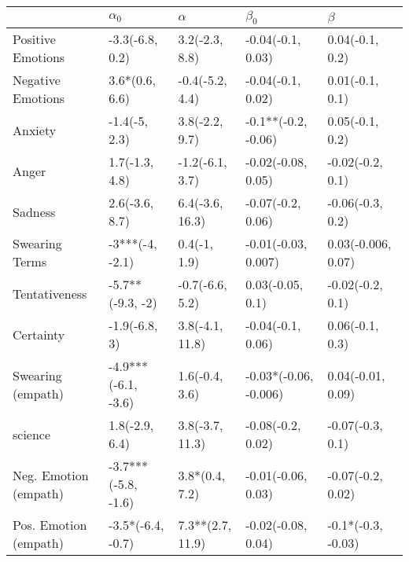 \begin{tabular}{lllll}
\toprule
{} &           $\alpha_0$ &          $\alpha$ &              $\beta_0$ &             $\beta$ \\
\midrule
Positive Emotions     &      -3.3(-6.8, 0.2) &    3.2(-2.3, 8.8) &      -0.04(-0.1, 0.03) &     0.04(-0.1, 0.2) \\
Negative Emotions     &       3.6*(0.6, 6.6) &   -0.4(-5.2, 4.4) &      -0.04(-0.1, 0.02) &     0.01(-0.1, 0.1) \\
Anxiety               &        -1.4(-5, 2.3) &    3.8(-2.2, 9.7) &    -0.1**(-0.2, -0.06) &     0.05(-0.1, 0.2) \\
Anger                 &       1.7(-1.3, 4.8) &   -1.2(-6.1, 3.7) &     -0.02(-0.08, 0.05) &    -0.02(-0.2, 0.1) \\
Sadness               &       2.6(-3.6, 8.7) &   6.4(-3.6, 16.3) &      -0.07(-0.2, 0.06) &    -0.06(-0.3, 0.2) \\
Swearing Terms        &      -3***(-4, -2.1) &      0.4(-1, 1.9) &    -0.01(-0.03, 0.007) &  0.03(-0.006, 0.07) \\
Tentativeness         &     -5.7**(-9.3, -2) &   -0.7(-6.6, 5.2) &       0.03(-0.05, 0.1) &    -0.02(-0.2, 0.1) \\
Certainty             &        -1.9(-6.8, 3) &   3.8(-4.1, 11.8) &      -0.04(-0.1, 0.06) &     0.06(-0.1, 0.3) \\
Swearing (empath)     &  -4.9***(-6.1, -3.6) &    1.6(-0.4, 3.6) &  -0.03*(-0.06, -0.006) &   0.04(-0.01, 0.09) \\
science               &       1.8(-2.9, 6.4) &   3.8(-3.7, 11.3) &      -0.08(-0.2, 0.02) &    -0.07(-0.3, 0.1) \\
Neg. Emotion (empath) &  -3.7***(-5.8, -1.6) &    3.8*(0.4, 7.2) &     -0.01(-0.06, 0.03) &   -0.07(-0.2, 0.02) \\
Pos. Emotion (empath) &    -3.5*(-6.4, -0.7) &  7.3**(2.7, 11.9) &     -0.02(-0.08, 0.04) &  -0.1*(-0.3, -0.03) \\
\bottomrule
\end{tabular}
